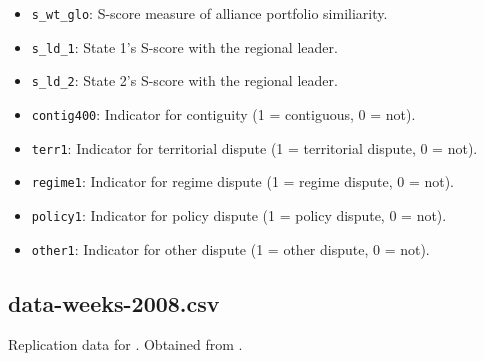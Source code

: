 \documentclass[12pt]{article}
\begin{document}
\begin{itemize}
  \item \texttt{s\_wt\_glo}: S-score measure of alliance portfolio similiarity.
  \item \texttt{s\_ld\_1}: State 1's S-score with the regional leader.
  \item \texttt{s\_ld\_2}: State 2's S-score with the regional leader.
  \item \texttt{contig400}: Indicator for contiguity (1 = contiguous, 0 = not).
  \item \texttt{terr1}: Indicator for territorial dispute (1 = territorial dispute, 0 = not).
  \item \texttt{regime1}: Indicator for regime dispute (1 = regime dispute, 0 = not).
  \item \texttt{policy1}: Indicator for policy dispute (1 = policy dispute, 0 = not).
  \item \texttt{other1}: Indicator for other dispute (1 = other dispute, 0 = not).
\end{itemize}

\subsection{data-weeks-2008.csv}

Replication data for \citet{Weeks:2008cj}.
Obtained from \citet{weeks2008data}.
\end{document}
